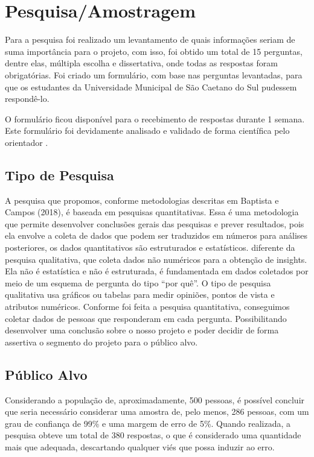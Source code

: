 % 

\chapter[Pesquisa/Amostragem]{Pesquisa/Amostragem}

Para a pesquisa foi realizado um levantamento de quais informações seriam de suma importância para o projeto, com isso, foi obtido um total de 15 perguntas, dentre elas, múltipla escolha e dissertativa, onde todas as respostas foram obrigatórias. Foi criado um formulário, com base nas perguntas levantadas, para que os estudantes da Universidade Municipal de São Caetano do Sul pudessem respondê-lo.

O formulário ficou disponível para o recebimento de respostas durante 1 semana. Este formulário foi devidamente analisado e validado de forma científica pelo orientador \imprimirorientador.

\section{Tipo de Pesquisa}
A pesquisa que propomos, conforme metodologias descritas em Baptista e Campos (2018), é baseada em pesquisas quantitativas. Essa é uma metodologia que permite desenvolver conclusões gerais das pesquisas e prever resultados, pois ela envolve a coleta de dados que podem ser traduzidos em números para análises posteriores, os dados quantitativos são estruturados e estatísticos. diferente da pesquisa qualitativa, que coleta dados não numéricos para a obtenção de insights. Ela não é estatística e não é estruturada, é fundamentada em dados coletados por meio de um esquema de pergunta do tipo “por quê”. O tipo de pesquisa qualitativa usa gráficos ou tabelas para medir opiniões, pontos de vista e atributos numéricos.
Conforme foi feita a pesquisa quantitativa, conseguimos coletar dados de pessoas que responderam em cada pergunta. Possibilitando desenvolver uma conclusão sobre o nosso projeto e poder decidir de forma assertiva o segmento do projeto para o público alvo.

\section{Público Alvo}
Considerando a população de, aproximadamente, 500 pessoas, é possível concluir que seria necessário considerar uma amostra de, pelo menos, 286 pessoas, com um grau de confiança de 99\% e uma margem de erro de 5\%. Quando realizada, a pesquisa obteve um total de 380 respostas, o que é considerado uma quantidade mais que adequada, descartando qualquer viés que possa induzir ao erro.

